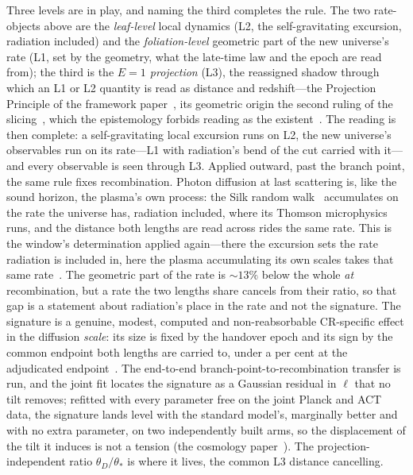 \documentclass[11pt,a4paper]{article}
\theoremstyle{plain}
\theoremstyle{definition}
\theoremstyle{remark}
\begin{document}
Three levels are in play, and naming the third completes the rule. The two rate-objects above are the
\emph{leaf-level} local dynamics (L2, the self-gravitating excursion, radiation included) and the
\emph{foliation-level} geometric part of the new universe's rate (L1, set by the geometry, what the late-time law
and the epoch are read from); the third is the \emph{$E=1$ projection} (L3), the reassigned shadow through which an L1
or L2 quantity is read as distance and redshift---the Projection Principle of the framework
paper~\cite{JanzenCRframework}, its geometric origin the second ruling of the slicing~\cite{JanzenOperator},
which the epistemology forbids reading as the existent~\cite{JanzenShadowExistence}. The reading is then complete: a self-gravitating
local excursion runs on L2, the new universe's observables run on its rate---L1 with radiation's bend of the cut
carried with it---and every observable is seen through L3. Applied outward, past the branch point, the same rule fixes recombination.
Photon diffusion at last scattering is, like the sound horizon, the plasma's own process: the Silk random
walk~\cite{Silk1968} accumulates on the rate the universe has, radiation included, where its Thomson microphysics runs,
and the distance both lengths are read across rides the same rate. This is the window's
determination applied again---there the excursion sets the rate radiation is included in, here the plasma
accumulating its own scales takes that same rate~\cite{JanzenCRcosmology}. The geometric part of the rate is ${\sim}13\%$
below the whole \emph{at} recombination, but a rate the two lengths share cancels from their
ratio, so that gap is a statement about radiation's place in the rate and not the signature. The signature is a genuine,
modest, computed and non-reabsorbable CR-specific effect in the diffusion \emph{scale}: its size is fixed by
the handover epoch and its sign by the common endpoint both lengths are carried to, under a per cent at the
adjudicated endpoint~\cite{JanzenCRcosmology}. The end-to-end branch-point-to-recombination transfer is run, and the joint
fit locates the signature as a Gaussian residual in $\ell$ that no tilt removes; refitted with every parameter
free on the joint Planck and ACT data, the signature lands level with the standard model's, marginally better
and with no extra parameter, on two independently built arms, so the displacement of the tilt it induces is
not a tension (the cosmology paper~\cite{JanzenCRcosmology}).
The projection-independent ratio $\theta_D/\theta_*$ is where it lives, the common L3 distance cancelling.
\end{document}
